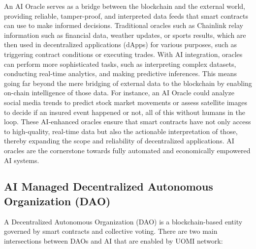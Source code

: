 \documentclass{article}
\begin{document}
An AI Oracle serves as a bridge between the blockchain and the external world, providing reliable, tamper-proof, and interpreted data feeds that smart contracts can use to make informed decisions. Traditional oracles such as Chainlink relay information such as financial data, weather updates, or sports results, which are then used in decentralized applications (dApps) for various purposes, such as triggering contract conditions or executing trades. With AI integration, oracles can perform more sophisticated tasks, such as interpreting complex datasets, conducting real-time analytics, and making predictive inferences. This means going far beyond the mere bridging of external data to the blockchain by enabling on-chain intelligence of those data. For instance, an AI Oracle could analyze social media trends to predict stock market movements or assess satellite images to decide if an insured event happened or not, all of this without humans in the loop. These AI-enhanced oracles ensure that smart contracts have not only access to high-quality, real-time data but also the actionable interpretation of those, thereby expanding the scope and reliability of decentralized applications. AI oracles are the cornerstone towards fully automated and economically empowered AI systems.


\subsection{AI Managed Decentralized Autonomous Organization (DAO) }

A Decentralized Autonomous Organization (DAO) is a blockchain-based entity governed by smart contracts and collective voting. There are two main intersections between DAOs and AI that are enabled by UOMI network:
\end{document}
